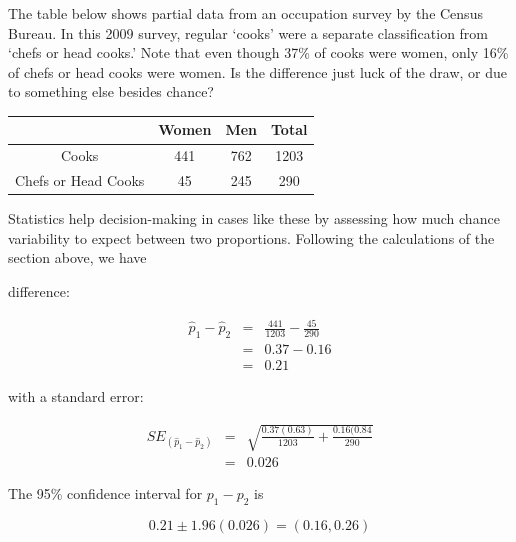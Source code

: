 \documentclass[11pt, chapterprefix=true]{scrbook}\usepackage[]{graphicx}\usepackage[]{color}
\begin{document}
The table below shows partial data from an occupation survey by the Census Bureau. In this 2009 survey, regular `cooks' were a separate classification from `chefs or head cooks.'  Note that even though 37\% of cooks were women, only 16\% of chefs or head cooks were women.  Is the difference just luck of the draw, or due to something else besides chance?

\begin{table}[ht]
\centering
\begin{tabular}{@{} cccc @{}} \hline
       & Women & Men & Total \\ \hline
Cooks & 441 & 762 & 1203 \\
Chefs or Head Cooks & 45 & 245 & 290 \\ \hline
\end{tabular}
\end{table}

Statistics help decision-making in cases like these by assessing how much chance variability to expect between two proportions.  Following the calculations of the section above, we have

\vspace{4mm}

\begin{minipage}[ht]{7cm}

difference: 

\begin{eqnarray*}
  \hat{p}_1 - \hat{p}_2 &=& \frac{441}{1203} - \frac{45}{290} \\
    &=& 0.37 - 0.16 \\
    &=& 0.21
\end{eqnarray*}

\end{minipage}
\begin{minipage}[ht]{7cm}

with a standard error:

\begin{eqnarray*}
  SE_{(\hat{p}_1 - \hat{p}_2)} &=& \sqrt{ \frac{0.37(0.63)}{1203} + \frac{0.16(0.84}{290}} \\
  &=& 0.026
\end{eqnarray*}

\end{minipage}

\vspace{5mm}

The 95\% confidence interval for $p_1 - p_2$ is

\begin{equation*}
0.21 \pm 1.96 (0.026) = (0.16, 0.26)
\end{equation*}
\end{document}
